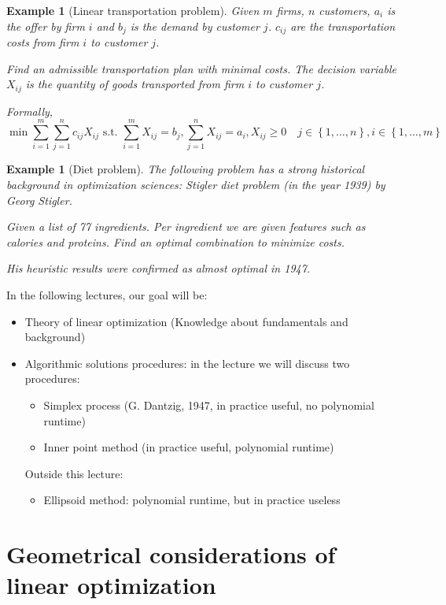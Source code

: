 \documentclass[a4paper]{article}
\numberwithin{lecref}{section}
\newcounter{exercises}
\newtheorem{example}[exercises]{Example}
\newtheorem*{Example}{Example}
\newcommand{\Set}[1]{\left\{#1\right\}}
\begin{document}
\begin{example}[Linear transportation problem]
  \label{example:3}
  Given $m$ firms, $n$ customers, $a_i$ is the offer by firm $i$ and $b_j$ is the demand by customer $j$.
  $c_{ij}$ are the transportation costs from firm $i$ to customer $j$.

  Find an admissible transportation plan with minimal costs.
  The decision variable $X_{ij}$ is the quantity of goods transported from firm $i$ to customer $j$.

  Formally,
  \[ \min{\sum_{i=1}^m \sum_{j=1}^n c_{ij} X_{ij}} \text{ s.t. } \sum_{i=1}^m X_{ij} = b_j, \sum_{j=1}^n X_{ij} = a_i, X_{ij} \geq 0 \quad j \in \Set{1, \dots, n}, i \in \Set{1, \dots, m} \]
\end{example}

\begin{Example}[Diet problem]
  The following problem has a strong historical background in optimization sciences:
  Stigler diet problem (in the year 1939) by Georg Stigler. 

  Given a list of 77 ingredients. Per ingredient we are given features such as calories and proteins.
  Find an optimal combination to minimize costs.

  His heuristic results were confirmed as almost optimal in 1947.
\end{Example}

In the following lectures, our goal will be:

\begin{itemize}
	\item Theory of linear optimization (Knowledge about fundamentals and background)
	\item Algorithmic solutions procedures: in the lecture we will discuss two procedures:
		\begin{itemize}
			\item Simplex process (G. Dantzig, 1947, in practice useful, no polynomial runtime)
			\item Inner point method (in practice useful, polynomial runtime)
		\end{itemize}
		Outside this lecture:
		\begin{itemize}
			\item Ellipsoid method: polynomial runtime, but in practice useless
		\end{itemize}
\end{itemize}

\section{Geometrical considerations of linear optimization}
\end{document}
